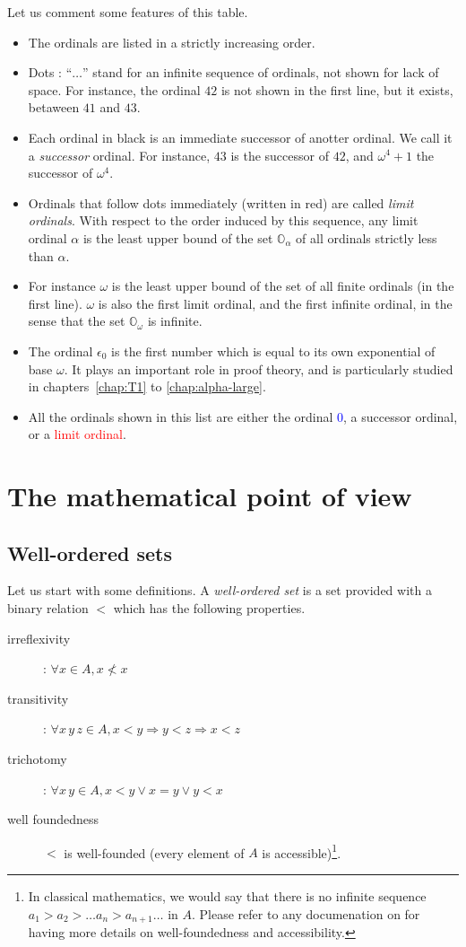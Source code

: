 Let us comment some features of this table.

\begin{itemize}
\item The ordinals are listed in a strictly increasing order. 
\item Dots : ``$\ldots$'' stand for an infinite sequence of ordinals, not shown for lack of space. For instance, the ordinal $42$ is not shown in the first line, but it exists, betaween $41$ and $43$.
\item Each ordinal in black is an immediate successor of anotter ordinal. We call it a \emph{successor} ordinal. For instance, $43$ is the successor of $42$, and $\omega^4+1$ the successor of $\omega^4$.
\item Ordinals that  follow dots immediately (written in red) are called \emph{limit ordinals}. With respect to the order induced by this sequence, any limit ordinal $\alpha$ is the least upper bound of  the set $\mathbb{O}_\alpha$ of all ordinals strictly less than $\alpha$.
\item
For instance $\omega$ is the least upper bound of the set of all finite ordinals (in the first line). $\omega$ is also the first limit ordinal, and the first infinite ordinal, in the sense that 
the set $\mathbb{O}_\omega$ is infinite.
\item The ordinal $\epsilon_0$ is the first number which is equal to its own exponential of base $\omega$. It plays an important role in proof theory, and is particularly studied in chapters~\ref{chap:T1} to \ref{chap:alpha-large}.
\item All the ordinals shown in this list are either the ordinal \textcolor{blue}{$0$},
a successor ordinal, or a \textcolor{red}{limit ordinal}.
\end{itemize}




\section{The mathematical point of view}

\subsection{Well-ordered sets}
Let us start with some definitions.
A  \emph{well-ordered set} is a set provided with a binary relation $<$ which has the following properties.
\begin{description}
\item[irreflexivity] : $\forall x\in A, x\not< x$
\item[transitivity] : $\forall x\,y\,z\in A, x<y \Rightarrow y<z \Rightarrow x<z$
\item[trichotomy]: $\forall x\,y\in A, x<y \vee x = y \vee y < x$
\item[well foundedness] $<$ is well-founded (every element of $A$ is accessible)\footnote{In classical mathematics, we would say that there is no infinite sequence $a_1>a_2> \dots a_n> a_{n+1}\dots$ in $A$. Please refer to any documenation on \coq{} for having more details on well-foundedness and accessibility.}.

\end{description}

